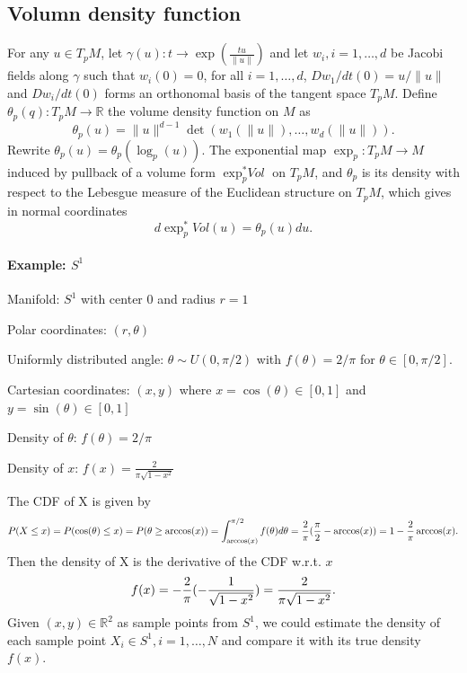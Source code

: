 \documentclass[11pt,a4paper,]{article}
\begin{document}
\hypertarget{volumn-density-function}{%
\subsection{Volumn density function}\label{volumn-density-function}}

For any \(u \in T_pM\), let \(\gamma(u): t \rightarrow \exp(\frac{tu}{\|u\|})\) and let \(w_i, i=1,\dots,d\) be Jacobi fields along \(\gamma\) such that \(w_i(0)=0\), for all \(i=1,\dots,d\), \(Dw_1/dt(0)=u/\|u\|\) and \(Dw_i/dt(0)\) forms an orthonomal basis of the tangent space \(T_pM\).
Define \(\theta_p(q): T_pM \rightarrow \mathbb{R}\) the volume density function on \(M\) as
\[
\theta_p(u) = \|u\|^{d-1} \det(w_1(\|u\|),\dots,w_d(\|u\|)).
\]
Rewrite \(\theta_p(u) = \theta_p(\log_p(u))\).
The exponential map \(\exp_p: T_pM \rightarrow M\) induced by pullback of a volume form \(\exp_p^*\textit{Vol}\) on \(T_pM\), and
\(\theta_p\) is its density with respect to the Lebesgue measure of the Euclidean structure on \(T_pM\), which gives in normal coordinates
\[
d\exp_p^*\textit{Vo}l(u) = \theta_p(u)du.
\]

\hypertarget{example-s1}{%
\paragraph{\texorpdfstring{Example: \(S^1\)}{Example: S\^{}1}}\label{example-s1}}

Manifold: \(S^1\) with center 0 and radius \(r=1\)

Polar coordinates: \((r, \theta)\)

Uniformly distributed angle: \(\theta \sim U(0, \pi/2)\) with \(f(\theta) = 2 / \pi\) for \(\theta \in [0, \pi /2]\).

Cartesian coordinates: \((x, y)\) where \(x = \cos(\theta) \in [0, 1]\) and \(y = \sin(\theta) \in [0, 1]\)

Density of \(\theta\): \(f(\theta) = 2 / \pi\)

Density of \(x\): \(f(x) = \frac{2}{\pi \sqrt{1-x^2}}\)

The CDF of X is given by
\[
P(X \leq x) = P(\cos(\theta) \leq x) \\
= P(\theta \geq \arccos(x)) \\
= \int_{\arccos(x)}^{\pi/2} f(\theta) d\theta \\
=  \frac{2}{\pi} (\frac{\pi}{2} - \arccos(x) ) \\
= 1 - \frac{2}{\pi} \arccos(x).
\]
Then the density of X is the derivative of the CDF w.r.t. \(x\)
\[
f(x) = -\frac{2}{\pi} (-\frac{1}{\sqrt{1 - x^2}}) \\
= \frac{2}{\pi \sqrt{1 - x^2}}.
\]
Given \((x, y) \in \mathbb{R}^2\) as sample points from \(S^1\), we could estimate the density of each sample point \(X_i \in S^1, i = 1, \dots, N\) and compare it with its true density \(f(x)\).
\end{document}
